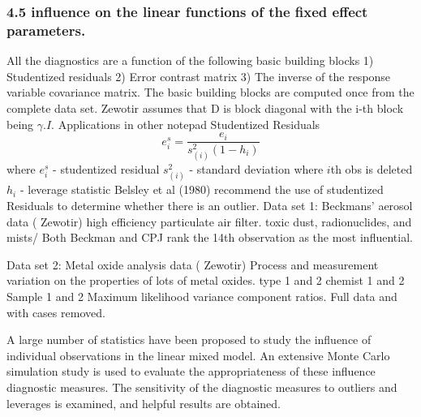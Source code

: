 \documentclass[12pt, a4paper]{article}
\begin{document}
\subsubsection*{4.5 influence on the linear functions of the fixed effect parameters.}
All the diagnostics are a function of the following basic building blocks
1)  	Studentized residuals
2)  	Error contrast matrix
3)  	The inverse of the response variable covariance matrix.
The basic building blocks are computed once from the complete data set.
Zewotir assumes that D is block diagonal with the i-th block being $\gamma. I$.
Applications in other notepad
Studentized Residuals
\[ e^s_i = \frac{e_i}{s^2_{(i)}(1-h_i)} \]
where
$e^s_i $ - studentized residual
$s^2_{(i)}$ - standard deviation where $i$th obs is deleted
$h_i$ - leverage statistic
Belsley et al (1980) recommend the use of studentized Residuals to determine whether there is an outlier.
Data set 1: Beckmans' aerosol data ( Zewotir)
high efficiency particulate air filter.
toxic dust, radionuclides, and mists/
Both Beckman and CPJ rank the 14th observation as the most influential.

\bigskip 
Data set 2: Metal oxide analysis data ( Zewotir)
Process and measurement variation on the properties of lots of metal oxides.
type 1 and 2
chemist 1 and 2
Sample 1 and 2
Maximum likelihood variance component ratios.
Full data and with cases removed.
\begin{framed}
	
A large number of statistics have been proposed to study the influence of individual 
observations in the linear mixed model. An extensive Monte Carlo simulation study is used 
to evaluate the appropriateness of these influence diagnostic measures. The sensitivity of 
the diagnostic measures to outliers and leverages is examined, and helpful results are 
obtained.
\citep{zewotir2006}
\end{framed}	
\end{document}
